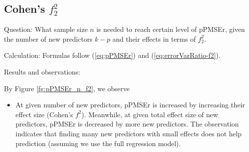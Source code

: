 \documentclass[11pt]{article}
\begin{document}
\subsection{Cohen's $f_2^2$}

Question: What sample size $n$ is needed to reach certain level of pPMSEr, given the number of new predictors $k-p$ and their effects in terms of $f_2^2$. 

Calculation: Formulas follow (\ref{eq:pPMSEr}) and (\ref{eq:errorVarRatio-f2}). 

Results and observations:

By Figure \ref{fg:pPMSEr_n_f2}, we observe
\begin{itemize}
\item At given number of new predictors, pPMSEr is increased by increasing their effect size (Cohen's $f^2$). Meanwhile, at given total effect size of new predictors, pPMSEr is decreased by more new predictors. The observation indicates that finding many new predictors with small effects does not help prediction (assuming we use the full regression model). 
\end{itemize}
\end{document}
